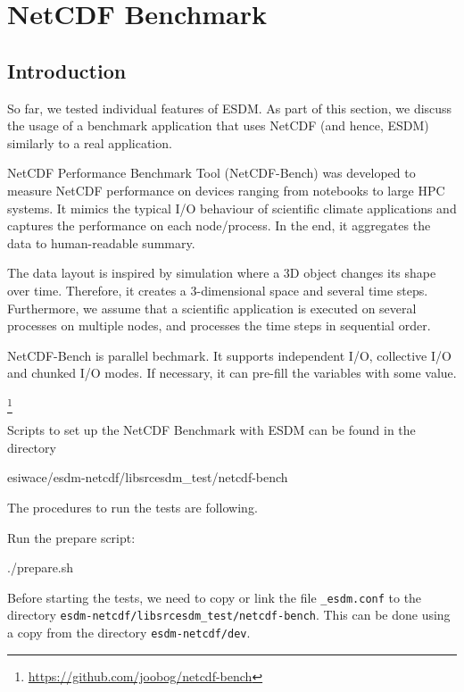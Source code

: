 \chapter{NetCDF Benchmark}
\label{ch:bench}

\section{Introduction}

So far, we tested individual features of ESDM. As part of this section, we discuss the usage of a benchmark application that uses NetCDF (and hence, ESDM) similarly to a real application.

{\itshape

NetCDF Performance Benchmark Tool (NetCDF-Bench) was developed to measure NetCDF performance on devices ranging from notebooks to large HPC systems. It mimics the typical I/O behaviour of scientific climate applications and captures the performance on each node/process. In the end, it aggregates the data to human-readable summary.

The data layout is inspired by simulation where a 3D object changes its shape over time. Therefore, it creates a 3-dimensional space and several time steps. Furthermore, we assume that a scientific application is executed on several processes on multiple nodes, and processes the time steps in sequential order.

NetCDF-Bench is parallel bechmark. It supports independent I/O, collective I/O and chunked I/O modes. If necessary, it can pre-fill the variables with some value.
}\footnote{\url{https://github.com/joobog/netcdf-bench}}

Scripts to set up the NetCDF Benchmark with ESDM can be found in the directory

\begin{framed}
esiwace/esdm-netcdf/libsrcesdm\_test/netcdf-bench
\end{framed}

The procedures to run the tests are following.

Run the prepare script:

\begin{framed}
./prepare.sh
\end{framed}

Before starting the tests, we need to copy or link the file \texttt{\_esdm.conf} to the directory \texttt{esdm-netcdf/libsrcesdm\_test/netcdf-bench}. This can be done using a copy from the directory \texttt{esdm-netcdf/dev}.

